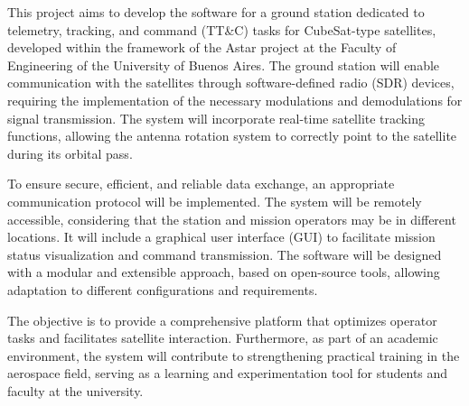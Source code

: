 This project aims to develop the software for a ground station dedicated to telemetry, tracking, and command (TT\&C) tasks for CubeSat-type satellites, developed within the framework of the Astar project at the Faculty of Engineering of the University of Buenos Aires. The ground station will enable communication with the satellites through software-defined radio (SDR) devices, requiring the implementation of the necessary modulations and demodulations for signal transmission. The system will incorporate real-time satellite tracking functions, allowing the antenna rotation system to correctly point to the satellite during its orbital pass.

To ensure secure, efficient, and reliable data exchange, an appropriate communication protocol will be implemented. The system will be remotely accessible, considering that the station and mission operators may be in different locations. It will include a graphical user interface (GUI) to facilitate mission status visualization and command transmission. The software will be designed with a modular and extensible approach, based on open-source tools, allowing adaptation to different configurations and requirements.

The objective is to provide a comprehensive platform that optimizes operator tasks and facilitates satellite interaction. Furthermore, as part of an academic environment, the system will contribute to strengthening practical training in the aerospace field, serving as a learning and experimentation tool for students and faculty at the university.
